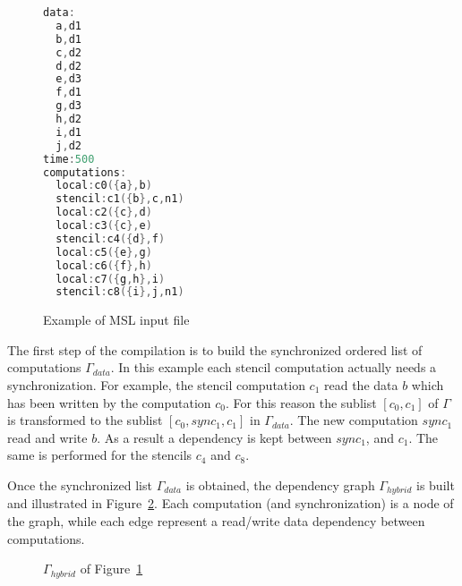 \begin{figure}[h!]
\begin{lstlisting}[basicstyle=\footnotesize,mathescape,frame=single,language=C++]
data:
  a,d1
  b,d1
  c,d2
  d,d2
  e,d3
  f,d1
  g,d3
  h,d2
  i,d1
  j,d2
time:500
computations:
  local:c0({a},b)
  stencil:c1({b},c,n1)
  local:c2({c},d)
  local:c3({c},e)
  stencil:c4({d},f)
  local:c5({e},g)
  local:c6({f},h)
  local:c7({g,h},i)
  stencil:c8({i},j,n1)
\end{lstlisting}
\caption{Example of MSL input file}
\label{fig:msinput}
\end{figure}

The first step of the compilation is to build the synchronized ordered list of computations $\Gamma_{data}$. In this example each stencil computation actually needs a synchronization. For example, the stencil computation $c_1$ read the data $b$ which has been written by the computation $c_0$. For this reason the sublist $[c_0,c_1]$ of $\Gamma$ is transformed to the sublist $[c_0,sync_1,c_1]$ in $\Gamma_{data}$. The new computation $sync_1$ read and write $b$. As a result a dependency is kept between $sync_1$, and $c_1$. The same is performed for the stencils $c_4$ and $c_8$.

Once the synchronized list $\Gamma_{data}$ is obtained, the dependency graph $\Gamma_{hybrid}$ is built and illustrated in Figure~\ref{fig:hyb}. Each computation (and synchronization) is a node of the graph, while each edge represent a read/write data dependency between computations.

\begin{figure}[h!]
\begin{center}
\caption{$\Gamma_{hybrid}$ of Figure~\ref{fig:msinput}}
\label{fig:hyb}
\end{center}
\end{figure}

